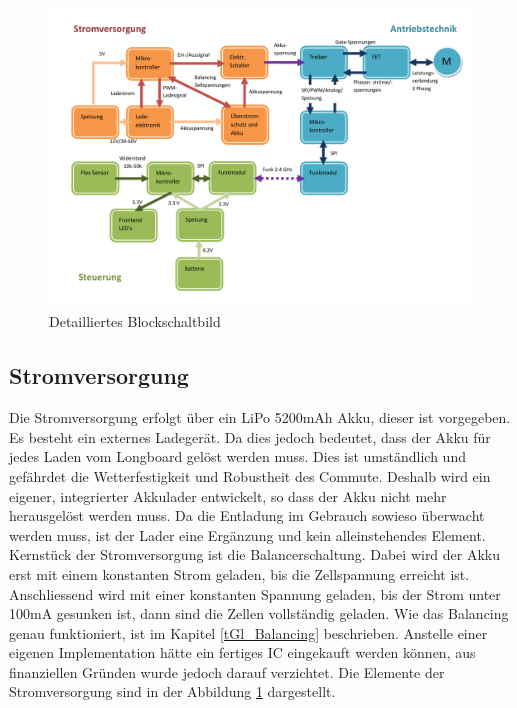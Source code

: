 \begin{figure}[h]
	\centering
	\includegraphics[width=\linewidth]{images/Grobkonzept_Blockschaltbild_detailliert}
	\caption[Detailliertes Blockschaltbild]{Detailliertes Blockschaltbild}
	\label{fig:grobkonzeptblockschaltbilddetailliert}
\end{figure}

\subsection*{Stromversorgung}
Die Stromversorgung erfolgt über ein LiPo 5200mAh Akku, dieser ist vorgegeben. Es besteht ein externes Ladegerät. Da dies jedoch bedeutet, dass der Akku für jedes Laden vom Longboard gelöst werden muss. Dies ist umständlich und gefährdet die Wetterfestigkeit und Robustheit des Commute. Deshalb wird ein eigener, integrierter Akkulader entwickelt, so dass der Akku nicht mehr herausgelöst werden muss. Da die Entladung im Gebrauch sowieso überwacht werden muss, ist der Lader eine Ergänzung und kein alleinstehendes Element. Kernstück der Stromversorgung ist die Balancerschaltung. Dabei wird der Akku erst mit einem konstanten Strom geladen, bis die Zellspannung erreicht ist. Anschliessend wird mit einer konstanten Spannung geladen, bis der Strom unter 100mA gesunken ist, dann sind die Zellen vollständig geladen. Wie das Balancing genau funktioniert, ist im Kapitel \ref{tGl_Balancing} beschrieben. Anstelle einer eigenen Implementation hätte ein fertiges IC eingekauft werden können, aus finanziellen Gründen wurde jedoch darauf verzichtet. Die Elemente der Stromversorgung sind in der Abbildung \ref{fig:grobkonzeptblockschaltbilddetailliert} dargestellt.

